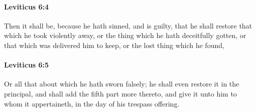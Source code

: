 		\paragraph{Leviticus 6:4} %
			\label{LEVITICUS-6-4}

			Then it shall be, because he hath sinned, and is guilty, that he shall restore that which he took violently away, or the thing which he hath deceitfully gotten, or that which was delivered him to keep, or the lost thing which he found,


		\paragraph{Leviticus 6:5} %
			\label{LEVITICUS-6-5}

			Or all that about which he hath sworn falsely; he shall even restore it in the principal, and shall add the fifth part more thereto, and give it unto him to whom it appertaineth, in the day of his trespass offering.

